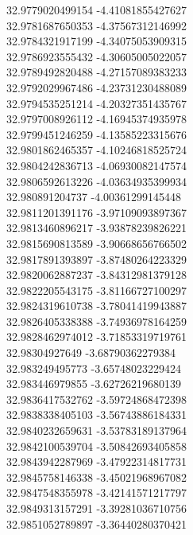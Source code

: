 {32.9779020499154	-4.41081855427627\\
32.9781687650353	-4.37567312146992\\
32.9784321917199	-4.34075053909315\\
32.9786923555432	-4.30605005022057\\
32.9789492820488	-4.27157089383233\\
32.9792029967486	-4.23731230488089\\
32.9794535251214	-4.20327351435767\\
32.9797008926112	-4.16945374935978\\
32.9799451246259	-4.13585223315676\\
32.9801862465357	-4.10246818525724\\
32.9804242836713	-4.06930082147574\\
32.9806592613226	-4.03634935399934\\
32.980891204737	-4.00361299145448\\
32.9811201391176	-3.97109093897367\\
32.9813460896217	-3.93878239826221\\
32.9815690813589	-3.90668656766502\\
32.9817891393897	-3.87480264223329\\
32.9820062887237	-3.84312981379128\\
32.9822205543175	-3.81166727100297\\
32.9824319610738	-3.78041419943887\\
32.9826405338388	-3.74936978164259\\
32.9828462974012	-3.71853319719761\\
32.98304927649	-3.68790362279384\\
32.983249495773	-3.65748023229424\\
32.983446979855	-3.62726219680139\\
32.9836417532762	-3.59724868472398\\
32.9838338405103	-3.56743886184331\\
32.9840232659631	-3.53783189137964\\
32.9842100539704	-3.50842693405858\\
32.9843942287969	-3.47922314817731\\
32.9845758146338	-3.45021968967082\\
32.9847548355978	-3.42141571217797\\
32.9849313157291	-3.39281036710756\\
32.9851052789897	-3.36440280370421\\
}
